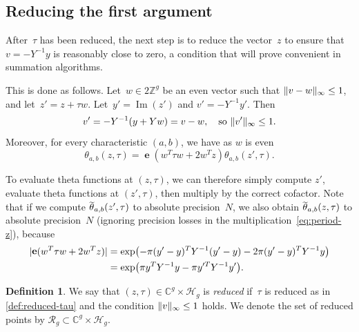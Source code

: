 \documentclass[12pt,oneside]{amsart}
\numberwithin{equation}{section}
\theoremstyle{definition}
\newtheorem{defn}[equation]{Definition}
\newcommand{\Z}{\mathbb{Z}}
\newcommand{\red}{\mathcal{R}}
\newcommand{\C}{\mathbb{C}}
\newcommand{\Half}{\mathcal{H}}
\DeclareMathOperator{\im}{Im}
\DeclareMathOperator{\thetatilde}{\rlap{\raisebox{-0.1ex}{$\widetilde{\phantom{\,t}}$}}\theta}
\DeclareMathOperator{\e}{\mathbf{e}}
\DeclarePairedDelimiter{\abs}{|}{|}
\DeclarePairedDelimiter{\paren}{(}{)}
\DeclarePairedDelimiter{\norm}{\|}{\|}
\begin{document}
\subsection{Reducing the first argument}
\label{subsec:z-reduction}

After~$\tau$ has been reduced, the next step is to reduce the vector~$z$ to
ensure that $v=-Y^{-1}y$ is reasonably close to zero, a condition that will
prove convenient in summation algorithms.

This is done as follows. Let~$w\in 2\Z^g$ be an even vector such that
$\norm{v-w}_\infty\leq 1$, and let~$z' = z + \tau w$. Let~$y' = \im(z')$ and
$v'=-Y^{-1}y'$. Then
\begin{equation}
  \label{eq:small-v}
  v' = -Y^{-1}(y + Y w) = v - w, \quad \text{so } \norm{v'}_\infty \leq 1.
\end{equation}
Moreover, for every characteristic $(a,b)$, we have as $w$ is even
\begin{equation}
  \label{eq:period-z}
  \theta_{a,b}(z,\tau) = \e(w^T\tau w + 2w^T z) \theta_{a,b}(z',\tau).
\end{equation}

To evaluate theta functions at $(z,\tau)$, we can therefore simply compute
$z'$, evaluate theta functions at $(z',\tau)$, then multiply by the correct
cofactor. Note that if we compute $\thetatilde_{a,b}(z',\tau)$ to absolute
precision~$N$, we also obtain $\thetatilde_{a,b}(z,\tau)$ to absolute
precision~$N$ (ignoring precision losses in the
multiplication~\eqref{eq:period-z}), because
\begin{equation}
  \label{eq:translate-thetatilde}
  \begin{aligned}
    \abs{\e(w^T\tau w + 2 w^T z)} &= \exp\paren[\big]{-\pi(y' - y)^T Y^{-1} (y' - y) - 2\pi (y'-y)^T Y^{-1} y}\\
    &= \exp\paren[\big]{\pi y^T Y^{-1} y - \pi y'^T Y^{-1} y'}.
  \end{aligned}
\end{equation}

\begin{defn}
  \label{def:reduced}
  We say that $(z,\tau) \in \C^g\times\Half_g$ is \emph{reduced} if~$\tau$ is
  reduced as in \cref{def:reduced-tau} and the condition
  $\norm{v}_\infty\leq 1$ holds. We denote the set of reduced points by
  $\red_g\subset \C^g\times\Half_g$.
\end{defn}
\end{document}
